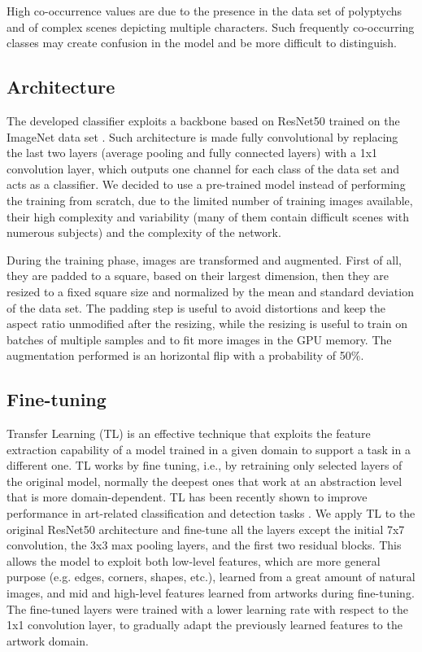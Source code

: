 \documentclass[acmlarge]{acmart}
\begin{document}
High co-occurrence values are due to the presence in the data set of polyptychs and of  complex scenes depicting multiple characters. Such frequently co-occurring classes may create confusion in the model and be more difficult to distinguish.

\subsection{Architecture}\label{sec:archres}

The developed classifier exploits a backbone based on ResNet50 \cite{he2016deep}  trained on the ImageNet data set \cite{deng2009imagenet}.
Such architecture is made fully convolutional by replacing the last two layers (average pooling and fully connected layers) with a 1x1 convolution layer, which outputs one channel for each class of the data set and acts as a classifier. We decided to use a pre-trained model instead of performing the training from scratch, due to the limited number of training images available, their high complexity and variability (many of them contain difficult scenes with numerous subjects) and the complexity of the network. 

During the training phase, images are transformed and augmented. First of all, they are padded to a square, based on their largest dimension, then they are resized to a fixed square size and normalized by the mean and standard deviation of the data set. The padding step is useful to avoid distortions and keep the aspect ratio unmodified after the resizing, while the resizing is useful to train on batches of multiple samples and to fit more images in the GPU memory. The augmentation performed is an horizontal flip with a probability of 50\%.

\subsection{Fine-tuning}\label{sec:meth-fine-tuning}
Transfer Learning (TL) is an effective technique that exploits the feature extraction capability of a model trained in a given domain to support a task in a different one. TL works by fine tuning, i.e., by retraining only selected  layers of the original model, normally the deepest ones that work at an abstraction level that is more domain-dependent. TL has been  recently shown to improve performance in art-related classification and detection tasks \cite{westlake2016detecting,cetinic2018fine}.  We apply TL to the original ResNet50 architecture and fine-tune all the layers except the initial 7x7 convolution, the 3x3 max pooling layers, and the first two residual blocks.
This allows the model to exploit both low-level features, which are more general purpose (e.g. edges, corners, shapes, etc.), learned from a great amount of natural images, and mid and high-level features learned from artworks during fine-tuning. The fine-tuned layers were trained with a lower learning rate with respect to the 1x1 convolution layer, to gradually adapt the previously learned features to the artwork domain.
\end{document}
